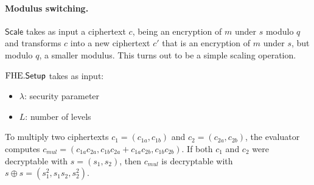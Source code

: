 \documentclass[11pt]{article}
\begin{document}



\paragraph{Modulus switching.}
$\mathsf{Scale}$ takes as input a ciphertext $c$, being an encryption of $m$ under $s$ modulo $q$ and transforms $c$ into a new ciphertext $c'$ that is an encryption of $m$ under $s$, but modulo $q$, a smaller modulus. This turns out to be a simple scaling operation. 



 $\mathrm{FHE}\mathsf{.}\mathsf{Setup}$ takes as input:
 \begin{itemize}
 \item $\lambda$: security parameter
 \item $L$: number of levels 
 \end{itemize} 
 

To multiply two ciphertexts $c_1 = (c_{1a}, c_{1b})$ and $c_2 = (c_{2a}, c_{2b})$, the evaluator computes
$c_{mul} = (c_{1a} c_{2a}, c_{1b} c_{2a} + c_{1a} c_{2b}, c_{1b} c_{2b})$. If both $c_1$ and $c_2$ were decryptable with $s = (s_1, s_2)$, then
$c_{mul}$ is decryptable with $s \oplus s = (s_1^2, s_1s_2, s_2^2)$. 

\end{document}
